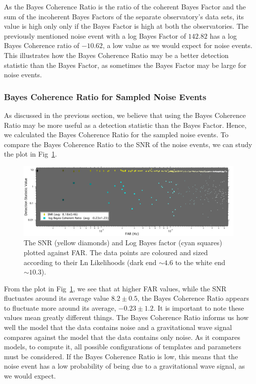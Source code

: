 \documentclass{article}
\begin{document}
  As the Bayes Coherence Ratio is the ratio of the coherent Bayes Factor and the sum of the incoherent Bayes Factors of the separate observatory's data sets, its value is high only only if the Bayes Factor is high at both the observatories. The previously mentioned noise event with a log Bayes Factor of $142.82$ has a log Bayes Coherence ratio of $-10.62$, a low value as we would expect for noise events. This illustrates how the Bayes Coherence Ratio may be a better detection statistic than the Bayes Factor, as sometimes the Bayes Factor may be large for noise events.\\
 
 
 
 \subsubsection{Bayes Coherence Ratio for Sampled Noise Events}
 
 As discussed in the previous section, we believe that using the Bayes Coherence Ratio may be more useful as a detection statistic than the Bayes Factor. Hence, we calculated the Bayes Coherence Ratio for the sampled noise events. To compare the Bayes Coherence Ratio to the SNR of the noise events, we can study the plot in Fig~\ref{Fig:BcrVSFAR}.\\
 

          
          
                   \begin{figure}[h]
                   	\centering
                   	\includegraphics[width=1\textwidth]{Figures/detectionStatVSfar8s.pdf} 
                   	\caption{The SNR (yellow diamonds) and Log Bayes factor (cyan squares) plotted against FAR. The data points are coloured and sized according to their Ln Likelihoods (dark end $\sim4.6$ to the white end $\sim10.3$). }
                   	\label{Fig:BcrVSFAR}
                   \end{figure}
                   
 
 From the plot in Fig~\ref{Fig:BcrVSFAR}, we see that at higher FAR values, while the SNR fluctuates around its average value $8.2\pm0.5$, the Bayes Coherence Ratio appears to fluctuate more around its average, $-0.23\pm1.2$. It is important to note these values mean greatly different things. The Bayes Coherence Ratio informs us how well the model that the data contains noise and a gravitational wave signal compares against the model that the data contains only noise. As it compares models, to compute it, all possible configurations of templates and parameters must be considered. If the Bayes Coherence Ratio is low, this means that the noise event has a low probability of being due to a gravitational wave signal, as we would expect.\\
 
\end{document}
